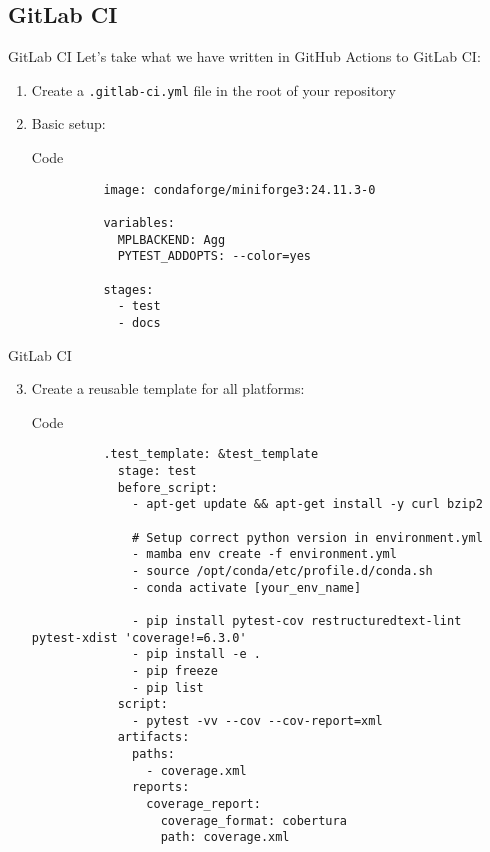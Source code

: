 \subsection{GitLab CI}
\begin{frame}[fragile]{
    GitLab CI
    \hfill
  }
  Let's take what we have written in GitHub Actions to GitLab CI:
  \begin{enumerate}
    \item Create a \texttt{.gitlab-ci.yml} file in the root of your repository
    \item Basic setup:
      \begin{block}{Code}
        \begin{verbatim}
          image: condaforge/miniforge3:24.11.3-0

          variables:
            MPLBACKEND: Agg
            PYTEST_ADDOPTS: --color=yes

          stages:
            - test
            - docs
        \end{verbatim}
      \end{block}
  \end{enumerate}
\end{frame}

\begin{frame}[fragile]{GitLab CI}
  \begin{enumerate}
    \setcounter{enumi}{2}
    \item Create a reusable template for all platforms:
      \begin{block}{Code}
        \footnotesize
        \begin{verbatim}
          .test_template: &test_template
            stage: test
            before_script:
              - apt-get update && apt-get install -y curl bzip2

              # Setup correct python version in environment.yml
              - mamba env create -f environment.yml
              - source /opt/conda/etc/profile.d/conda.sh
              - conda activate [your_env_name]

              - pip install pytest-cov restructuredtext-lint pytest-xdist 'coverage!=6.3.0'
              - pip install -e .
              - pip freeze
              - pip list
            script:
              - pytest -vv --cov --cov-report=xml
            artifacts:
              paths:
                - coverage.xml
              reports:
                coverage_report:
                  coverage_format: cobertura
                  path: coverage.xml
        \end{verbatim}
      \end{block}
  \end{enumerate}
\end{frame}

